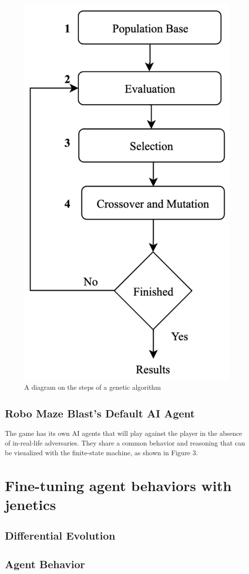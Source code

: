\documentclass[sigconf]{acmart} %
\begin{document}
\begin{figure}
\centering
\includegraphics[width = 0.4\linewidth]{pictures/Steps-of-Genetic-Algorithms.png}
\caption{\label{fig:Steps-of-Genetic-Algorithm}A diagram on the steps of a genetic algorithm}
\end{figure}


\subsection{Robo Maze Blast's Default AI Agent}
The game has its own AI agents that will play against the player in the absence of in-real-life adversaries. They share a common behavior and reasoning that can be visualized with the finite-state machine, as shown in 
Figure 3.




\section{Fine-tuning agent behaviors with jenetics}


\subsection{Differential Evolution}

\subsection{Agent Behavior}
\end{document}
